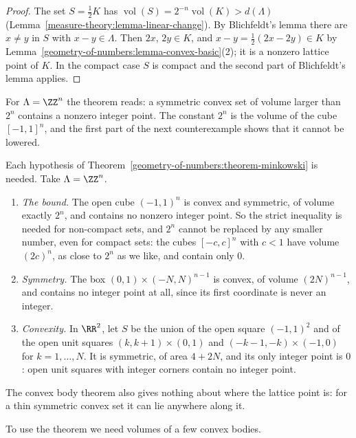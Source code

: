 \begin{proof}
The set $S = \frac12K$ has $\operatorname{vol}(S) = 2^{-n}\operatorname{vol}(K) > d(\Lambda)$ (Lemma~\ref{measure-theory:lemma-linear-change}). By Blichfeldt's lemma there are $x \neq y$ in $S$
with $x - y \in \Lambda$. Then $2x$, $2y \in K$, and $x - y = \frac12(2x - 2y) \in K$ by Lemma~\ref{geometry-of-numbers:lemma-convex-basic}(2); it is a nonzero lattice point of $K$. In the compact case
$S$ is compact and the second part of Blichfeldt's lemma applies.
\end{proof}

For $\Lambda = \ZZ^n$ the theorem reads: a symmetric convex set of volume larger than $2^n$ contains a nonzero integer point. The constant $2^n$ is the volume of the cube $[-1, 1]^n$, and the
first part of the next counterexample shows that it cannot be lowered.

\begin{counterexample}\label{geometry-of-numbers:counterexample-minkowski}
Each hypothesis of Theorem~\ref{geometry-of-numbers:theorem-minkowski} is needed. Take $\Lambda = \ZZ^n$.
\begin{enumerate}
\item \emph{The bound.} The open cube $(-1, 1)^n$ is convex and symmetric, of volume exactly $2^n$, and contains no nonzero integer point. So the strict inequality is needed for non-compact sets, and
$2^n$ cannot be replaced by any smaller number, even for compact sets: the cubes $[-c, c]^n$ with $c < 1$ have volume $(2c)^n$, as close to $2^n$ as we like, and contain only $0$.
\item \emph{Symmetry.} The box $(0, 1) \times (-N, N)^{n-1}$ is convex, of volume $(2N)^{n-1}$, and contains no integer point at all, since its first coordinate is never an integer.
\item \emph{Convexity.} In $\RR^2$, let $S$ be the union of the open square $(-1, 1)^2$ and of the open unit squares $(k, k + 1) \times (0, 1)$ and $(-k - 1, -k) \times (-1, 0)$ for
$k = 1, \ldots, N$. It is symmetric, of area $4 + 2N$, and its only integer point is $0$: open unit squares with integer corners contain no integer point.
\end{enumerate}
The convex body theorem also gives nothing about where the lattice point is: for a thin symmetric convex set it can lie anywhere along it.
\end{counterexample}

To use the theorem we need volumes of a few convex bodies.

